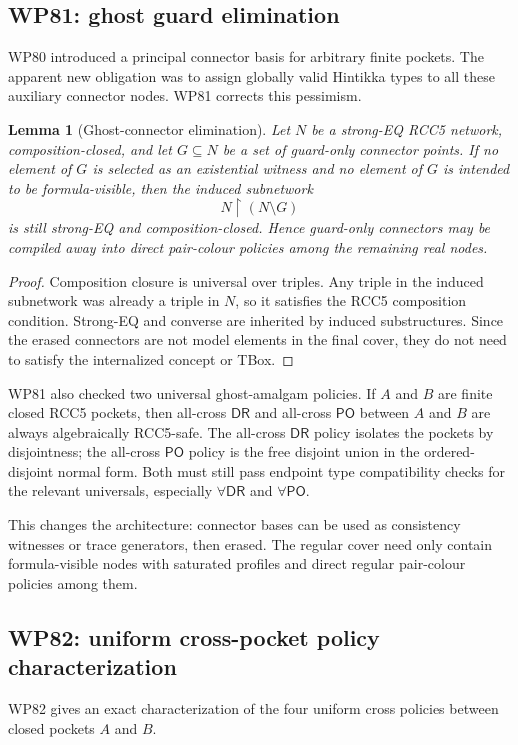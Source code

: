 \documentclass[11pt]{article}
\newtheorem{lemma}[theorem]{Lemma}
\newcommand{\PO}{\mathsf{PO}}
\newcommand{\DR}{\mathsf{DR}}
\begin{document}
\subsection{WP81: ghost guard elimination}
WP80 introduced a principal connector basis for arbitrary finite pockets.  The apparent new obligation was to assign globally valid Hintikka types to all these auxiliary connector nodes.  WP81 corrects this pessimism.

\begin{lemma}[Ghost-connector elimination]
Let $N$ be a strong-EQ RCC5 network, composition-closed, and let $G\subseteq N$ be a set of guard-only connector points.  If no element of $G$ is selected as an existential witness and no element of $G$ is intended to be formula-visible, then the induced subnetwork
\[
N\upharpoonright (N\setminus G)
\]
is still strong-EQ and composition-closed.  Hence guard-only connectors may be compiled away into direct pair-colour policies among the remaining real nodes.
\end{lemma}

\begin{proof}
Composition closure is universal over triples.  Any triple in the induced subnetwork was already a triple in $N$, so it satisfies the RCC5 composition condition.  Strong-EQ and converse are inherited by induced substructures.  Since the erased connectors are not model elements in the final cover, they do not need to satisfy the internalized concept or TBox.
\end{proof}

WP81 also checked two universal ghost-amalgam policies.  If $A$ and $B$ are finite closed RCC5 pockets, then all-cross $\DR$ and all-cross $\PO$ between $A$ and $B$ are always algebraically RCC5-safe.  The all-cross $\DR$ policy isolates the pockets by disjointness; the all-cross $\PO$ policy is the free disjoint union in the ordered-disjoint normal form.  Both must still pass endpoint type compatibility checks for the relevant universals, especially $\forall\DR$ and $\forall\PO$.

This changes the architecture: connector bases can be used as consistency witnesses or trace generators, then erased.  The regular cover need only contain formula-visible nodes with saturated profiles and direct regular pair-colour policies among them.

\subsection{WP82: uniform cross-pocket policy characterization}
WP82 gives an exact characterization of the four uniform cross policies between closed pockets $A$ and $B$.
\end{document}
